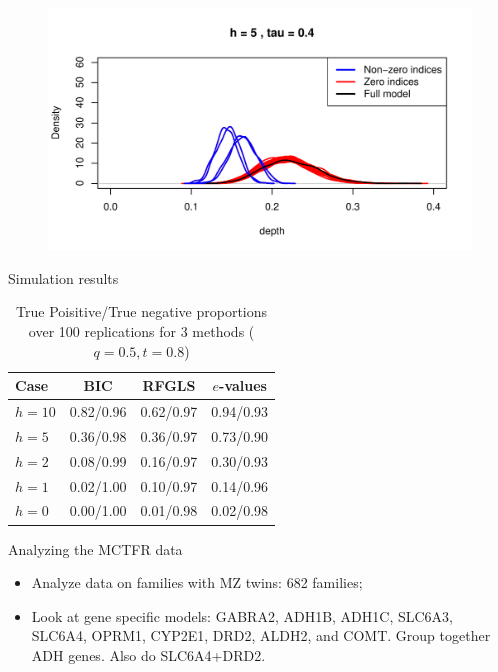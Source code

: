 \documentclass[handout,10pt]{beamer}
\begin{document}
\begin{frame}
\begin{figure}
\includegraphics[width=\textwidth]{../Codes/plot_h5_tau4}
\end{figure}
\end{frame}

\begin{frame}{Simulation results}
\begin{table}
\centering
\begin{tabular}{l|c|c|c}
\textbf{Case} & \textbf{BIC} & \textbf{RFGLS} & \textbf{$e$-values} \\\hline
$h=10$ & 0.82/0.96 & 0.62/0.97 & 0.94/0.93\\
$h=5$ & 0.36/0.98 & 0.36/0.97 & 0.73/0.90\\
$h=2$ & 0.08/0.99 & 0.16/0.97 & 0.30/0.93\\
$h=1$ & 0.02/1.00 & 0.10/0.97 & 0.14/0.96\\
$h=0$ & 0.00/1.00 & 0.01/0.98 & 0.02/0.98\\
\hline
\end{tabular}
\caption{True Poisitive/True negative proportions over 100 replications for 3 methods ($q=0.5, t=0.8$)}
\end{table}
\end{frame}

\begin{frame}{Analyzing the MCTFR data}

\begin{itemize}
\item Analyze data on families with MZ twins: 682 families;
\item Look at gene specific models: GABRA2, ADH1B,
ADH1C, SLC6A3, SLC6A4, OPRM1, CYP2E1, DRD2, ALDH2, and COMT. Group together ADH genes. Also do SLC6A4+DRD2.
\end{itemize}
\end{frame}
\end{document}

